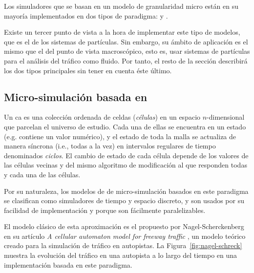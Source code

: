 Los simuladores que se basan en un modelo de granularidad micro están en su mayoría implementados en dos tipos de paradigma:  y .

Existe un tercer punto de vista a la hora de implementar este tipo de modelos, que es el de los sistemas de partículas. Sin embargo, su ámbito de aplicación es el mismo que el del punto de vista macroscópico, esto es, usar sistemas de partículas para el análisis del tráfico como fluido. Por tanto, el resto de la sección describirá los dos tipos principales sin tener en cuenta éste último.

\subsection{Micro-simulación basada en }

Un \Acrfull{ca} es una colección ordenada de celdas (\textit{células}) en un espacio $n$-dimensional que parcelan el universo de estudio. Cada una de ellas se encuentra en un estado (e.g. contiene un valor numérico), y el estado de toda la malla se actualiza de manera síncrona (i.e., todas a la vez) en intervalos regulares de tiempo denominados \textit{ciclos}. El cambio de estado de cada célula depende de los valores de las células vecinas y del mismo algoritmo de modificación al que responden todas y cada una de las células.

Por su naturaleza, los modelos de de micro-simulación basados en este paradigma se clasifican como simuladores de tiempo y espacio discreto, y son usados por su facilidad de implementación y porque son fácilmente paralelizables.

El modelo clásico de esta aproximación es el propuesto por Nagel-Scherckenberg en su artículo \textit{A cellular automaton model for freeway traffic} \cite{Nagel1992}, un modelo teórico creado para la simulación de tráfico en autopistas. La Figura~\ref{fig:nagel-schreck} muestra la evolución del tráfico en una autopista a lo largo del tiempo en una implementación basada en este paradigma.

